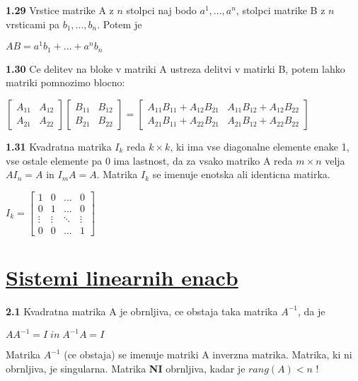 \documentclass{article}
\begin{document}
\begin{multicols}{3}
\textbf{1.29} Vrstice matrike A z $n$ stolpci naj bodo
$a^{1}, \dots, a^{n}$, stolpci matrike B z $n$ vrsticami pa
$b_{1}, \dots, b_{n}$. Potem je
\begin{center}
    $AB = a^{1}b_{1} + \dots + a^{n}b_{n}$
\end{center}

\textbf{1.30} Ce delitev na bloke v matriki A ustreza delitvi v matirki B,
potem lahko matriki pomnozimo blocno:
\begin{center}
    $\begin{bmatrix}
        A_{11} & A_{12}\\
        A_{21} & A_{22}
    \end{bmatrix}
    \begin{bmatrix}
        B_{11} & B_{12}\\
        B_{21} & B_{22}
    \end{bmatrix} =
    \begin{bmatrix}
        A_{11}B_{11} + A_{12}B_{21} & A_{11}B_{12} + A_{12}B_{22}\\
        A_{21}B_{11} + A_{22}B_{21} & A_{21}B_{12} + A_{22}B_{22}
    \end{bmatrix}$
\end{center}

\textbf{1.31} Kvadratna matrika $I_{k}$ reda $k \times k$, ki ima vse diagonalne
elemente enake 1, vse ostale elemente pa 0 ima lastnost, da za vsako matriko A
reda $m \times n$ velja $AI_{n} = A$ in $I_{m}A = A$. Matrika $I_{k}$ se imenuje
enotska ali identicna matirka.
\begin{center}
    $I_{k}=
    \begin{bmatrix}
        1 & 0 & \hdots & 0\\
        0 & 1 & \hdots & 0 \\
        \vdots & \vdots & \ddots & \vdots\\
        0 & 0 & \hdots & 1
    \end{bmatrix} 
    $
\end{center}

\section{\underline{Sistemi linearnih enacb}}

\textbf{2.1} Kvadratna matrika A je obrnljiva, ce obstaja taka matrika
$A^{-1}$, da je
\begin{center}
    $AA^{-1} = I\;
    in\;
    A^{-1}A = I
    $
\end{center}
Matrika $A^{-1}$ (ce obstaja) se imenuje matriki A inverzna matrika.
Matrika, ki ni obrnljiva, je singularna. Matrika \textbf{NI} obrnljiva, kadar je
$rang(A) < n$ !


\end{multicols}
\end{document}

